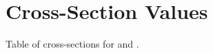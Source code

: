 %
%
%
%
%
%
%
%

%
%

\chapter{Cross-Section Values}
\label{app:crossSection}
Table of cross-sections for  and .

%
% 
% 
